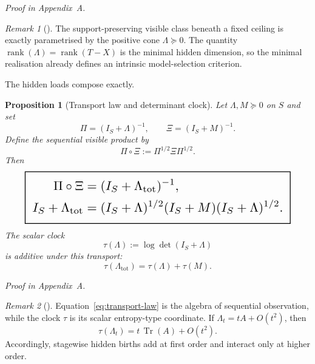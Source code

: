 \documentclass[11pt,a4paper]{article}
\numberwithin{equation}{section}
\DeclareMathOperator{\Tr}{Tr}
\DeclareMathOperator{\rank}{rank}
\newcommand{\geomboxed}[1]{%
  \setlength{\fboxsep}{8pt}%
  \setlength{\fboxrule}{0.9pt}%
  \fbox{\scalebox{1.5}{$\displaystyle #1$}}%
}
\theoremstyle{thmcompact}
\newtheorem{proposition}[theorem]{Proposition}
\theoremstyle{remark}
\newtheorem*{remarkplain}{Remark}
\newenvironment{remark}[1][]%
{\begin{remarkbox}\begin{remarkplain}[#1]\normalfont}
{\end{remarkplain}\end{remarkbox}}
\newcommand{\proofappendix}{\par{\hfill\scriptsize\emph{Proof in Appendix~A.}}\par}
\begin{document}
\proofappendix

\begin{remark}
The support-preserving visible class beneath a fixed ceiling is exactly parametrised by the positive cone $\Lambda\succeq 0$. The quantity $\rank(\Lambda)=\rank(T-X)$ is the minimal hidden dimension, so the minimal realisation already defines an intrinsic model-selection criterion.
\end{remark}

The hidden loads compose exactly.

\begin{proposition}[Transport law and determinant clock]
\label{prop:transport}
Let $\Lambda,M\succeq 0$ on $S$ and set
\begin{equation}
\Pi=(I_S+\Lambda)^{-1},
\qquad
\Xi=(I_S+M)^{-1}.
\label{eq:Pi-Xi}
\end{equation}
Define the sequential visible product by
\begin{equation}
\Pi\circ\Xi:=\Pi^{1/2}\Xi\Pi^{1/2}.
\label{eq:seq-product}
\end{equation}
Then
\begin{equation}
\label{eq:transport-law}
\geomboxed{\begin{aligned}
\Pi\circ\Xi&=(I_S+\Lambda_{\mathrm{tot}})^{-1},\\
I_S+\Lambda_{\mathrm{tot}}&=(I_S+\Lambda)^{1/2}(I_S+M)(I_S+\Lambda)^{1/2}.
\end{aligned}}
\end{equation}
The scalar clock
\begin{equation}
\tau(\Lambda):=\log\det(I_S+\Lambda)
\label{eq:clock-def}
\end{equation}
is additive under this transport:
\begin{equation}
\tau(\Lambda_{\mathrm{tot}})=\tau(\Lambda)+\tau(M).
\label{eq:clock-add}
\end{equation}
\end{proposition}

\proofappendix

\begin{remark}
Equation~\eqref{eq:transport-law} is the algebra of sequential observation, while the clock $\tau$ is its scalar entropy-type coordinate. If $\Lambda_t=tA+O(t^2)$, then
\begin{equation}
\tau(\Lambda_t)=t\,\Tr(A)+O(t^2).
\label{eq:clock-local}
\end{equation}
Accordingly, stagewise hidden births add at first order and interact only at higher order.
\end{remark}
\end{document}
